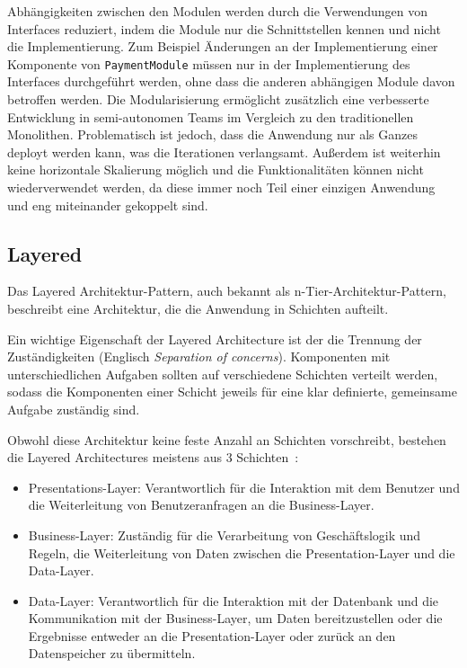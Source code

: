 \documentclass[acmtog]{acmart}
\begin{document}
Abhängigkeiten zwischen den Modulen werden durch die Verwendungen von Interfaces
reduziert, indem die Module nur die Schnittstellen kennen und nicht die Implementierung.
Zum Beispiel Änderungen an der Implementierung einer Komponente von \texttt{PaymentModule} müssen nur
in der Implementierung des Interfaces durchgeführt werden, ohne dass die anderen
abhängigen Module davon betroffen werden.
Die Modularisierung ermöglicht zusätzlich eine verbesserte Entwicklung in semi-autonomen Teams im
Vergleich zu den traditionellen Monolithen.
Problematisch ist jedoch, dass die Anwendung nur als Ganzes deployt werden kann, was
die Iterationen verlangsamt.
Außerdem ist weiterhin keine horizontale Skalierung möglich und die Funktionalitäten
können nicht wiederverwendet werden, da diese immer noch Teil einer einzigen Anwendung
und eng miteinander gekoppelt sind.

\subsection{Layered}
Das Layered Architektur-Pattern, auch bekannt als n-Tier-Architektur-Pattern, beschreibt eine
Architektur, die die Anwendung in Schichten aufteilt.

Ein wichtige Eigenschaft der Layered Architecture ist der die Trennung der Zuständigkeiten
(Englisch \textit{Separation of concerns}). Komponenten mit unterschiedlichen Aufgaben sollten
auf verschiedene Schichten verteilt werden, sodass die Komponenten einer Schicht jeweils für
eine klar definierte, gemeinsame Aufgabe zuständig sind. \cite[S. 34]{layered2}

Obwohl diese Architektur keine feste Anzahl an Schichten vorschreibt,
bestehen die Layered Architectures meistens aus 3 Schichten~\cite []{layered2}:
\begin{itemize}
\item Presentations-Layer: Verantwortlich für die Interaktion mit dem Benutzer und
die Weiterleitung von Benutzeranfragen an die Business-Layer.
\item Business-Layer: Zuständig für die Verarbeitung von Geschäftslogik und Regeln, die Weiterleitung von Daten zwischen
  die Presentation-Layer und die Data-Layer.
\item Data-Layer: Verantwortlich für die Interaktion mit der Datenbank und die Kommunikation mit der Business-Layer,
um Daten bereitzustellen oder die Ergebnisse entweder an die Presentation-Layer
  oder zurück an den Datenspeicher zu übermitteln.
\end{itemize}
\end{document}
